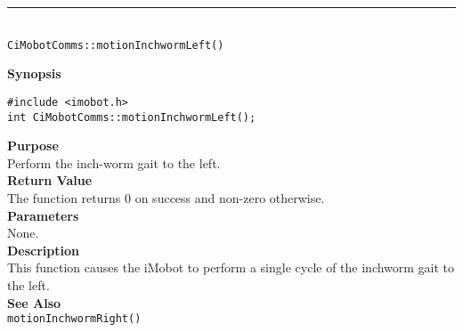 \noindent
\vspace{5pt}
\rule{4.5in}{0.015in}\\
\noindent
{\LARGE \texttt{CiMobotComms::motionInchwormLeft()}}\\
{}

\noindent
{\bf Synopsis}\\
\begin{verbatim}
#include <imobot.h>
int CiMobotComms::motionInchwormLeft();
\end{verbatim}

\noindent
{\bf Purpose}\\
Perform the inch-worm gait to the left.\\

\noindent
{\bf Return Value}\\
The function returns 0 on success and non-zero otherwise.\\

\noindent
{\bf Parameters}\\
None.\\

\noindent
{\bf Description}\\
This function causes the iMobot to perform a single cycle of the inchworm gait
to the left.\\

\noindent
{\bf See Also}\\
\texttt{motionInchwormRight()}

